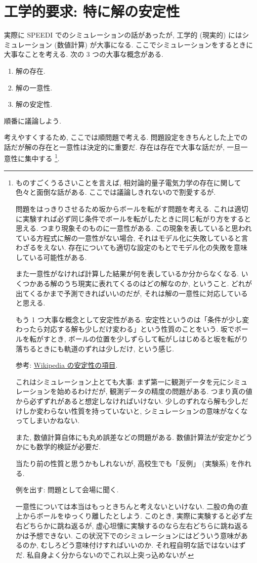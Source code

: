 \documentclass[openany, a4paper, oneside]{jsbook}
\begin{document}
\section{工学的要求: 特に解の安定性}

実際に SPEEDI でのシミュレーションの話があったが, 工学的 (現実的) にはシミュレーション (数値計算) が大事になる.
ここでシミュレーションをするときに大事なことを考える.
次の 3 つの大事な概念がある.
\begin{enumerate}
\item 解の存在.
\item 解の一意性.
\item 解の安定性.
\end{enumerate}
順番に議論しよう.

考えやすくするため, ここでは順問題で考える.
問題設定をきちんとした上での話だが解の存在と一意性は決定的に重要だ.
存在は存在で大事な話だが, 一旦一意性に集中する \footnote{ものすごくうるさいことを言えば, 相対論的量子電気力学の存在に関して色々と面倒な話がある. ここでは議論しきれないので割愛するが.

問題をはっきりさせるため坂からボールを転がす問題を考える.
これは適切に実験すれば必ず同じ条件でボールを転がしたときに同じ転がり方をすると思える.
つまり現象そのものに一意性がある.
この現象を表していると思われている方程式に解の一意性がない場合,
それはモデル化に失敗していると言わざるをえない.
存在についても適切な設定のもとでモデル化の失敗を意味している可能性がある.

また一意性がなければ計算した結果が何を表しているか分からなくなる.
いくつかある解のうち現実に表れてくるのはどの解なのか, ということ.
どれが出てくるかまで予測できればいいのだが, それは解の一意性に対応していると思える.

もう 1 つ大事な概念として安定性がある.
安定性というのは「条件が少し変わったら対応する解も少しだけ変わる」という性質のことをいう.
坂でボールを転がすとき,
ボールの位置を少しずらして転がしはじめると坂を転がり落ちるときにも軌道のずれは少しだけ, という感じ.

参考: \href{http://ja.wikipedia.org/wiki/\%E5\%AE\%89\%E5\%AE\%9A\%E6\%80\%A7\%E7\%90\%86\%E8\%AB\%96}{Wikipedia の安定性の項目}.

これはシミュレーション上とても大事:
まず第一に観測データを元にシミュレーションを始めるわけだが,
観測データの精度の問題がある.
つまり真の値から必ずずれがあると想定しなければいけない.
少しのずれなら解も少しだけしか変わらない性質を持っていないと,
シミュレーションの意味がなくなってしまいかねない.

また, 数値計算自体にも丸め誤差などの問題がある.
数値計算法が安定かどうかにも数学的検証が必要だ.

当たり前の性質と思うかもしれないが, 高校生でも「反例」 (実験系) を作れる.

例を出す: 問題として会場に聞く.

一意性については本当はもっときちんと考えないといけない.
二股の角の直上からボールをゆっくり離したとしよう.
このとき, 実際に実験すると必ず左右どちらかに跳ね返るが, 虚心坦懐に実験するのなら左右どちらに跳ね返るかは予想できない.
この状況下でのシミュレーションにはどういう意味があるのか, むしろどう意味付けすればいいのか.
それ程自明な話ではないはずだ.
私自身よく分からないのでこれ以上突っ込めないが.}.
\end{document}
